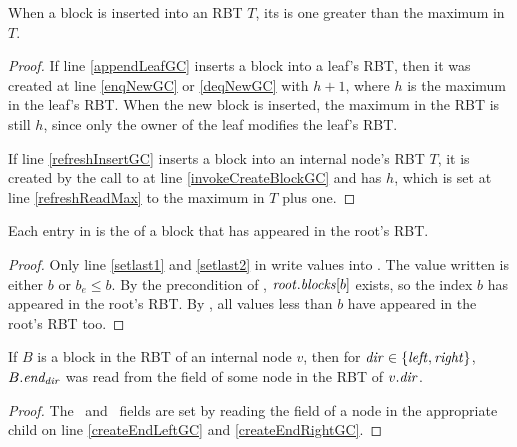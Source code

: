 \begin{observation}\label{RBTinsertions}
When a block is inserted into an RBT $T$, its  is one greater than the maximum  in $T$.
\end{observation}
\begin{proof}
If line \ref{appendLeafGC} inserts a block into a leaf's RBT, then it was created at 
line \ref{enqNewGC} or \ref{deqNewGC} with  $h+1$, where $h$ is the maximum 
in the leaf's RBT.  When the new block is inserted, the maximum  in the RBT is still $h$,
since only the owner of the leaf modifies the leaf's RBT.

If line \ref{refreshInsertGC} inserts a block  into an internal node's RBT $T$,
it is created by the call to  at line \ref{invokeCreateBlockGC} and 
has  $h$, which is set at line \ref{refreshReadMax} to  the maximum  in $T$ plus one.
\end{proof}

\begin{observation}\label{lastinroot}
Each entry in  is the  of a block that has appeared in the root's RBT.
\end{observation}
\begin{proof}
Only line \ref{setlast1} and \ref{setlast2} in  write values into .
The value written is either $b$ or $b_e \leq b$.
By the precondition of , $\mbox{\textnormal{\textit{root}}}.\mbox{\textit{blocks}}[b]$ exists, so the index $b$ has appeared
in the root's RBT.
By , all values less than $b$ have appeared in the root's RBT too.
\end{proof}

\begin{observation}
\label{edirGC} 
If $B$ is a block in the RBT of an internal node $v$, then for $\mbox{\textnormal{\textit{dir}}} \in \{\mbox{\textit{left}},\mbox{\textit{right}}\}$,
$B.\mbox{\textit{end\textsubscript{dir}}}$ was read from the  field of some node in the RBT of $v.\mbox{\textnormal{\textit{dir}}}$.
\end{observation}
\begin{proof}
The \eleft\ and \eright\ fields are set by reading the  field of a node in the appropriate child
on line \ref{createEndLeftGC} and \ref{createEndRightGC}.
\end{proof}

